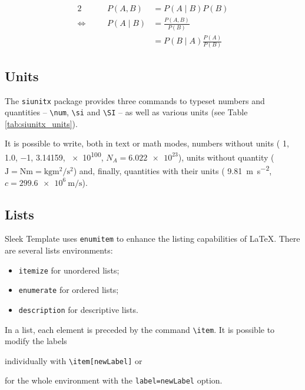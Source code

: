 \documentclass[a4paper, 12pt]{report}
\def\tbs{\textbackslash}
\begin{document}
    \begin{alignat*}{2}
                              & & P(A, B)  & = P(A \mid B) P(B)                        \\
        \Leftrightarrow \quad & & P(A \mid B) & = \frac{P(A, B)}{P(B)}                 \\
                              & &          & = P(B \mid A) \frac{P(A)}{P(B)}
    \end{alignat*}

    \subsection{Units}

    The \texttt{siunitx} package provides three commands to typeset numbers and quantities -- \texttt{\tbs{}num}, \texttt{\tbs{}si} and \texttt{\tbs{}SI} -- as well as various units (see Table \ref{tab:siunitx_units}).

    It is possible to write, both in text or math modes, numbers without units (\eg{} \num{1}, \num{1.0}, \num{-1}, \num{3.14159}, \num{e100}, $N_A = \num{6.022e23}$), units without quantity (\eg{} $\si{\joule} = \si{\newton\meter} = \si{\kilogram\meter\squared\per\second\squared}$) and, finally, quantities with their units (\eg{} \SI{9.81}{\meter\per\second\squared}, $c = \SI{299.6e6}{\meter\per\second}$).

    \subsection{Lists}

    Sleek Template uses \texttt{enumitem} to enhance the listing capabilities of \LaTeX{}. There are several lists environments:
    \begin{itemize}[noitemsep]
        \item \texttt{itemize} for unordered lists;
        \item \texttt{enumerate} for ordered lists;
        \item \texttt{description} for descriptive lists.
    \end{itemize}

    In a list, each element is preceded by the command \texttt{\tbs{}item}. It is possible to modify the labels
    \begin{enumerate*}
        \item individually with \texttt{\tbs{}item[newLabel]} or
        \item for the whole environment with the \texttt{label=newLabel} option.
    \end{enumerate*}
\end{document}
